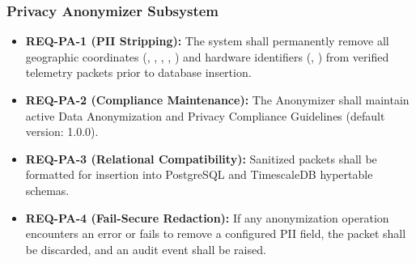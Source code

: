 \documentclass[a4paper]{article}
\begin{document}
\subsubsection{Privacy Anonymizer Subsystem}
\begin{itemize}
    \item \textbf{REQ-PA-1 (PII Stripping):} The system shall permanently remove all geographic coordinates (, , , , ) and hardware identifiers (, ) from verified telemetry packets prior to database insertion.
    \item \textbf{REQ-PA-2 (Compliance Maintenance):} The Anonymizer shall maintain active Data Anonymization and Privacy Compliance Guidelines (default version: 1.0.0).
    \item \textbf{REQ-PA-3 (Relational Compatibility):} Sanitized packets shall be formatted for insertion into PostgreSQL and TimescaleDB hypertable schemas.
    \item \textbf{REQ-PA-4 (Fail-Secure Redaction):} If any anonymization operation encounters an error or fails to remove a configured PII field, the packet shall be discarded, and an audit event shall be raised.
\end{itemize}
\end{document}
